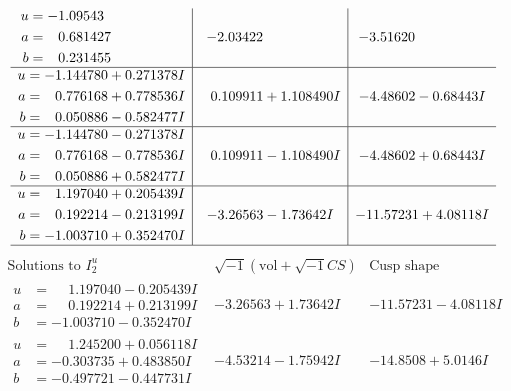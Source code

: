 \documentclass[1p]{elsarticle_modified}
\theoremstyle{definition}
\newcommand{\I}{\sqrt{-1}}
\begin{document}
$$\begin{array}{c|c|c}
\begin{aligned}
u &= -1.09543\phantom{ +0.000000I} \\
a &= \phantom{-}0.681427\phantom{ +0.000000I} \\
b &= \phantom{-}0.231455\phantom{ +0.000000I}\end{aligned}
 & -2.03422\phantom{ +0.000000I} & -3.51620\phantom{ +0.000000I} \\ \hline\begin{aligned}
u &= -1.144780 + 0.271378 I \\
a &= \phantom{-}0.776168 + 0.778536 I \\
b &= \phantom{-}0.050886 - 0.582477 I\end{aligned}
 & \phantom{-}0.109911 + 1.108490 I & -4.48602 - 0.68443 I \\ \hline\begin{aligned}
u &= -1.144780 - 0.271378 I \\
a &= \phantom{-}0.776168 - 0.778536 I \\
b &= \phantom{-}0.050886 + 0.582477 I\end{aligned}
 & \phantom{-}0.109911 - 1.108490 I & -4.48602 + 0.68443 I \\ \hline\begin{aligned}
u &= \phantom{-}1.197040 + 0.205439 I \\
a &= \phantom{-}0.192214 - 0.213199 I \\
b &= -1.003710 + 0.352470 I\end{aligned}
 & -3.26563 - 1.73642 I & -11.57231 + 4.08118 I\\
 \hline 
 \end{array}$$\newpage$$\begin{array}{c|c|c}  
\text{Solutions to }I^u_{2}& \I (\text{vol} + \sqrt{-1}CS) & \text{Cusp shape}\\
 \hline 
\begin{aligned}
u &= \phantom{-}1.197040 - 0.205439 I \\
a &= \phantom{-}0.192214 + 0.213199 I \\
b &= -1.003710 - 0.352470 I\end{aligned}
 & -3.26563 + 1.73642 I & -11.57231 - 4.08118 I \\ \hline\begin{aligned}
u &= \phantom{-}1.245200 + 0.056118 I \\
a &= -0.303735 + 0.483850 I \\
b &= -0.497721 - 0.447731 I\end{aligned}
 & -4.53214 - 1.75942 I & -14.8508 + 5.0146 I \\ \hline\begin{aligned}

\end{aligned}
\end{array}$$
\end{document}

